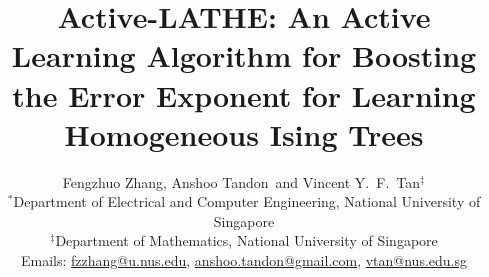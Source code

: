 \documentclass[11pt,onecolumn]{article}
\begin{document}
\title{Active-LATHE: An Active Learning Algorithm for Boosting the Error Exponent for Learning Homogeneous Ising Trees} 
\date{}
 



\author{Fengzhuo Zhang\footnotemark[1], Anshoo Tandon\footnotemark[1] \footnotemark[2] $\,$ and Vincent Y.~F.~Tan$^\ddagger$ \\ $^*$Department of Electrical and Computer Engineering, National University of Singapore \\
$^\ddagger$Department of Mathematics, National University of Singapore \\
Emails: \url{fzzhang@u.nus.edu}, \url{anshoo.tandon@gmail.com}, \url{vtan@nus.edu.sg}}



\maketitle

\renewcommand{\thefootnote}{\fnsymbol{footnote}}
\end{document}
